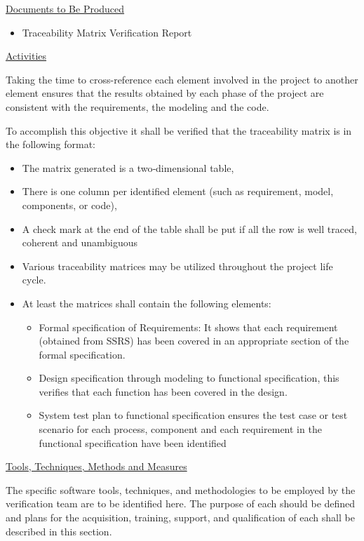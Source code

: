 \documentclass{template/openetcs_report}
\begin{document}
\underline{Documents to Be Produced} 

\begin{itemize}
\item Traceability Matrix Verification Report
\end{itemize}

\underline{Activities}

Taking the time to cross-reference each element involved in the project to another element ensures that the results obtained by each phase of the project are consistent with the requirements, the modeling and the code. 

To accomplish this objective it shall be verified that the traceability matrix is in the following format:

\begin{itemize}

\item The matrix generated is a two‑dimensional table,
\item There is one column per identified element (such as requirement, model, components, or code),
\item A check mark at the end of the table shall be put if all the row is well traced, coherent and unambiguous
\item Various traceability matrices may be utilized throughout the project life cycle.  \item At least the matrices shall contain the following elements:
\begin{itemize}
\item Formal specification of Requirements: It shows that each requirement (obtained from SSRS) has been covered in an appropriate section of the formal specification.
\item Design specification through modeling to functional specification, this verifies that each function has been covered in the design.
\item System test plan to functional specification ensures the test case or test scenario for each process, component and each requirement in the functional specification have been identified
\end{itemize}
\end{itemize}

\underline{Tools, Techniques, Methods and Measures} 

The specific software tools, techniques, and methodologies to be
employed by the verification team are to be identified here. 
The purpose of each should be defined and plans for the acquisition,
training, support, and qualification of each shall be described in
this section. 
\end{document}
